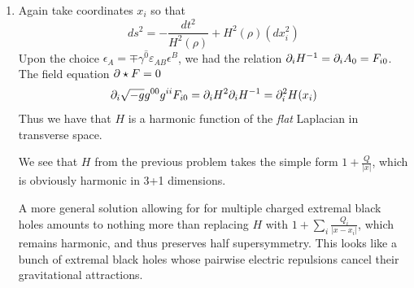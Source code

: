 \documentclass[11pt, class=article, crop=false]{standalone}
\begin{document}
\begin{enumerate}
	We have not yet derived the spatial dependence of $\epsilon$. Taking $\mu = i$ we get
	\[
		\d_i \epsilon_A + \frac14 \omega_{i \, ab} \Gamma^{ab} \epsilon_A - \frac14 F_{\nu \rho} \gamma^{\nu \rho} \gamma_i \varepsilon_{AB} \epsilon^B
	\]
	Now we must use that $\omega_{i\, \hat j \hat k} = - \d_n A (\delta_{ij} \delta^n_k - \delta_{ik} \delta^n_j)$. Using the $\mu=0$ constraint we get:
	\[
		\begin{aligned}
			&\d_i \epsilon_A - \frac12 \d_k A \;  \gamma_{i\, \hat k} \epsilon_A - \frac12 F_{0i} \gamma^{0} \cancel{\gamma^i \gamma_i} \varepsilon_{AB} \epsilon^B = 0\\
			&  \d_i \epsilon_A + \frac12 \d_k A\;  e^{-A}\,  \gamma^{i\, \hat k} \epsilon_A \mp  \frac12 \d_i e^{A} H \gamma^{\hat 0} \varepsilon_{AB} \epsilon^B = 0\\
			&\d_i \epsilon_A + \frac12 \d_k A \,  \gamma^{\hat i\, \hat k} \epsilon_A - \frac12 \d_i e^{A} e^{-A} \epsilon_A = 0
		\end{aligned}
	\]
	Now the $\gamma^{\hat i \hat k}$ is nothing more than a \emph{generator of rotations} acting on $\epsilon_A$. Since we are assuming spherical symmetry, $\gamma^{\hat i \hat k} \epsilon_A = 0$ and we are left with the differential equation:
	\[
		\d_i \epsilon_A = \frac12 \d_i A  \epsilon_A \Rightarrow \epsilon_A = e^{1/2 A} \epsilon_0
	\]
	where $\epsilon_0$ is a constant spinor satisfying \eqref{eq:spinorconstraint}.
	
	Because the constraint $\epsilon_A = \mp \gamma^{\hat 0} \varepsilon_{AB} \epsilon^B$ applies to half the space of spinors at any given point, we have that the extremal RN solution is half-BPS. 
	
	\item 
	Again take coordinates $x_i$ so that
	\[
		ds^2 = -\frac{dt^2}{H^2(\rho)} + H^2(\rho) (dx_i^2)
	\]
	 Upon the choice $\epsilon_A = \mp \gamma^{\hat 0} \varepsilon_{AB}  \epsilon^B$, we had the relation $\partial_i H^{-1} = \partial_i A_0 = F_{i0}$. The field equation $\partial \star F = 0$
	 \[
	 	\partial_i \sqrt{-g} g^{00} g^{ii} F_{i0} = \partial_i H^2 \partial_i H^{-1} = \partial_i^2 H(x_i)
	 \]
	 Thus we have that $H$ is a harmonic function of the \emph{flat} Laplacian in transverse space. 
	
	We see that $H$ from the previous problem takes the simple form $1+ \frac{Q}{|x|}$, which is obviously harmonic in 3+1 dimensions.
	
	A more general solution allowing for for multiple charged extremal black holes amounts to nothing more than replacing $H$ with $1 + \sum_i \frac{Q_i}{|x - x_i|}$, which remains harmonic, and thus preserves half supersymmetry. This looks like a bunch of extremal black holes whose pairwise electric repulsions cancel their gravitational attractions.
	

\end{enumerate}
\end{document}
